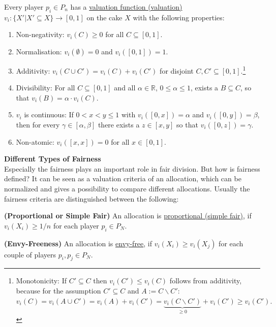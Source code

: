 Every player $p_i\in P_n$ has a \underline{valuation function (valuation)} $v_i:\{X'|X' \subseteq X\} \rightarrow [0,1]$ on the cake $X$ with the following properties:
\begin{enumerate}
\item Non-negativity: $v_i(C)\geq 0$ for all $C\subseteq [0,1].$
\item Normalisation: $v_i(\emptyset)=0$ and $v_i([0,1])=1.$
\item Additivity: $v_i(C \cup C')=v_i(C)+v_i(C')$ for disjoint
$C,C'\subseteq [0,1].$\footnote{Monotonicity: If $C' \subseteq C$ then $v_i(C') \leq v_i(C)$ follows from additivity, because for the assumption $C' \subseteq C$ and $A:=C\backslash C'$: $v_i(C)=v_i(A\cup C')=v_i(A)+v_i(C')=\underbrace{v_i(C\backslash C')}_{\geq 0}+v_i(C')\geq v_i(C').$}
\item Divisibility: For all $C\subseteq [0,1]$ and all $\alpha \in
\mathbb{R}$, $0\leq \alpha \leq 1$, exists a $B\subseteq C$, so that
$v_i(B)=\alpha \cdot v_i(C).$
\item  $v_i$ is continuous: If $0<x<y\leq 1$ with $v_i([0,x])=\alpha$ and
$v_i([0,y])=\beta$, then for every $\gamma \in [\alpha,\beta]$ there exists a $z \in [x,y]$ so that $v_i([0,z])=\gamma.$
\item Non-atomic:  $v_i([x,x])=0$ for all $x\in [0,1].$
\end{enumerate}
\textbf{Different Types of Fairness}\\
\newline
Especially the fairness plays an important role in fair division. But how is fairness defined? It can be seen as a valuation criteria of an allocation, which can be normalized and gives a possibility to compare different allocations. Usually the fairness criteria are distinguished between the following:
\begin{defi}{\textbf{(Proportional or Simple Fair)}}
\newline An allocation is \underline{proportional (simple fair)}, if
$v_i(X_i) \geq 1/n$ for each player $p_i \in P_N$.
\end{defi}
\begin{defi}{\textbf{(Envy-Freeness)}}
\newline An allocation is \underline{envy-free}, if $v_i(X_i) \geq
v_i(X_j)$ for each couple of players $p_i, p_j \in P_N$.
\end{defi}
